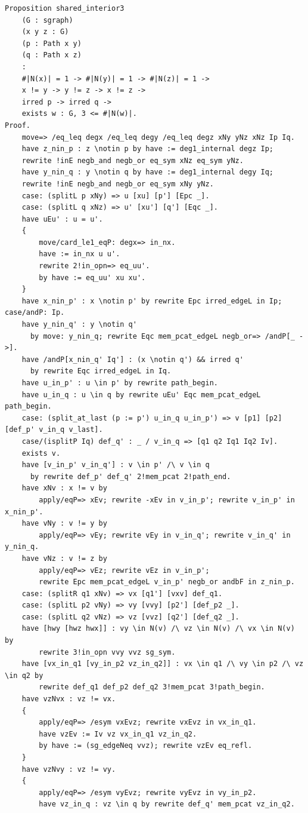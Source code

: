\begin{verbatim}
Proposition shared_interior3 
    (G : sgraph) 
    (x y z : G) 
    (p : Path x y) 
    (q : Path x z) 
    :
    #|N(x)| = 1 -> #|N(y)| = 1 -> #|N(z)| = 1 ->
    x != y -> y != z -> x != z ->
    irred p -> irred q ->
    exists w : G, 3 <= #|N(w)|.
Proof.
    move=> /eq_leq degx /eq_leq degy /eq_leq degz xNy yNz xNz Ip Iq.
    have z_nin_p : z \notin p by have := deg1_internal degz Ip; 
    rewrite !inE negb_and negb_or eq_sym xNz eq_sym yNz.
    have y_nin_q : y \notin q by have := deg1_internal degy Iq;
    rewrite !inE negb_and negb_or eq_sym xNy yNz.
    case: (splitL p xNy) => u [xu] [p'] [Epc _].
    case: (splitL q xNz) => u' [xu'] [q'] [Eqc _].
    have uEu' : u = u'.
    {
        move/card_le1_eqP: degx=> in_nx.
        have := in_nx u u'.
        rewrite 2!in_opn=> eq_uu'.
        by have := eq_uu' xu xu'.
    }
    have x_nin_p' : x \notin p' by rewrite Epc irred_edgeL in Ip; case/andP: Ip.
    have y_nin_q' : y \notin q' 
      by move: y_nin_q; rewrite Eqc mem_pcat_edgeL negb_or=> /andP[_ ->].
    have /andP[x_nin_q' Iq'] : (x \notin q') && irred q' 
      by rewrite Eqc irred_edgeL in Iq.
    have u_in_p' : u \in p' by rewrite path_begin.
    have u_in_q : u \in q by rewrite uEu' Eqc mem_pcat_edgeL path_begin.
    case: (split_at_last (p := p') u_in_q u_in_p') => v [p1] [p2] [def_p' v_in_q v_last].
    case/(isplitP Iq) def_q' : _ / v_in_q => [q1 q2 Iq1 Iq2 Iv].
    exists v.
    have [v_in_p' v_in_q'] : v \in p' /\ v \in q 
      by rewrite def_p' def_q' 2!mem_pcat 2!path_end.
    have xNv : x != v by 
        apply/eqP=> xEv; rewrite -xEv in v_in_p'; rewrite v_in_p' in x_nin_p'.
    have vNy : v != y by 
        apply/eqP=> vEy; rewrite vEy in v_in_q'; rewrite v_in_q' in y_nin_q.
    have vNz : v != z by 
        apply/eqP=> vEz; rewrite vEz in v_in_p'; 
        rewrite Epc mem_pcat_edgeL v_in_p' negb_or andbF in z_nin_p.
    case: (splitR q1 xNv) => vx [q1'] [vxv] def_q1.
    case: (splitL p2 vNy) => vy [vvy] [p2'] [def_p2 _].
    case: (splitL q2 vNz) => vz [vvz] [q2'] [def_q2 _].
    have [hwy [hwz hwx]] : vy \in N(v) /\ vz \in N(v) /\ vx \in N(v) by 
        rewrite 3!in_opn vvy vvz sg_sym.
    have [vx_in_q1 [vy_in_p2 vz_in_q2]] : vx \in q1 /\ vy \in p2 /\ vz \in q2 by
        rewrite def_q1 def_p2 def_q2 3!mem_pcat 3!path_begin.
    have vzNvx : vz != vx. 
    {
        apply/eqP=> /esym vxEvz; rewrite vxEvz in vx_in_q1. 
        have vzEv := Iv vz vx_in_q1 vz_in_q2.
        by have := (sg_edgeNeq vvz); rewrite vzEv eq_refl.
    }
    have vzNvy : vz != vy.
    {
        apply/eqP=> /esym vyEvz; rewrite vyEvz in vy_in_p2.
        have vz_in_q : vz \in q by rewrite def_q' mem_pcat vz_in_q2.

\end{verbatim}
